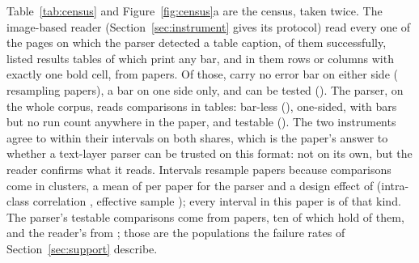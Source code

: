 \documentclass[sigconf,anonymous]{aamas}
\begin{document}
Table~\ref{tab:census} and Figure~\ref{fig:census}a are the census, taken
twice. The image-based reader (Section~\ref{sec:instrument} gives its
protocol) read every one of the \nCzPagesDrawn{} pages on which the parser
detected a table caption, \nCzPagesRead{} of them successfully, listed
\nCzTables{} results tables of which \nCzTablesWithBar{} print any bar, and
in them \nCzGroups{} rows or columns with exactly one bold cell, from
\nCzPapersWithGroups{} papers. Of those, \nCzNeither{} carry no error bar on
either side (\nCzNeitherCi{} resampling papers), \nCzOneSide{} a bar on one
side only, and \nCzTestable{} can be tested (\nCzTestableCi{}). The parser,
on the whole corpus, reads \nAComparisons{} comparisons in
\nATablesYielding{} tables: \nAPctNeither{} bar-less (\nAPctNeitherCi{}),
\nAPctOneSide{} one-sided, \nAPctNoN{} with bars but no run count anywhere
in the paper, and \nAPctTestable{} testable (\nAPctTestableCi{}). The two
instruments agree to within their intervals on both shares, which is the
paper's answer to whether a text-layer parser can be trusted on this
format: not on its own, but the reader confirms what it reads. Intervals
resample papers because comparisons come in clusters, a mean of
\nAMeanCluster{} per paper for the parser and a design effect of
\nADesignEffect{} (intra-class correlation \nAIcc{}, effective sample
\nANEff{}); every interval in this paper is of that kind. The parser's
\nANTestable{} testable comparisons come from \nAPapersTestable{} papers,
ten of which hold \nTopTenPapersShare{} of them, and the reader's
\nCzReaderFailN{} from \nCzReaderFailPapers{}; those are the populations
the failure rates of Section~\ref{sec:support} describe.
\end{document}
